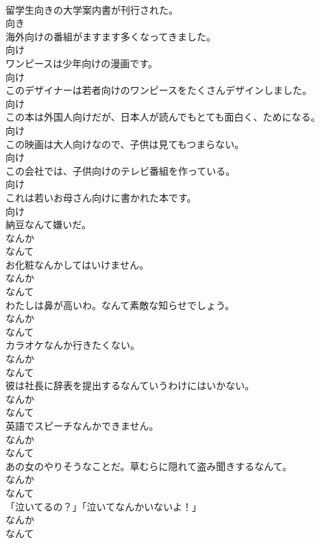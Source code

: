 \documentclass[8pt]{extreport}
\begin{document}
\begin{CJK}{UTF8}{min}
\\	留学生向きの大学案内書が刊行された。	
\\	向き
\\	海外向けの番組がますます多くなってきました。	
\\	向け
\\	ワンピースは少年向けの漫画です。	
\\	向け
\\	このデザイナーは若者向けのワンピースをたくさんデザインしました。	
\\	向け
\\	この本は外国人向けだが、日本人が読んでもとても面白く、ためになる。	
\\	向け
\\	この映画は大人向けなので、子供は見てもつまらない。	
\\	向け
\\	この会社では、子供向けのテレビ番組を作っている。	
\\	向け
\\	これは若いお母さん向けに書かれた本です。	
\\	向け
\\	納豆なんて嫌いだ。	
\\	なんか 
\\	なんて
\\	お化粧なんかしてはいけません。	
\\	なんか 
\\	なんて
\\	わたしは鼻が高いわ。なんて素敵な知らせでしょう。	
\\	なんか 
\\	なんて
\\	カラオケなんか行きたくない。	
\\	なんか 
\\	なんて
\\	彼は社長に辞表を提出するなんていうわけにはいかない。	
\\	なんか 
\\	なんて
\\	英語でスピーチなんかできません。	
\\	なんか 
\\	なんて
\\	あの女のやりそうなことだ。草むらに隠れて盗み聞きするなんて。	
\\	なんか 
\\	なんて
\\	「泣いてるの？」「泣いてなんかいないよ！」	
\\	なんか 
\\	なんて

\end{CJK}
\end{document}
